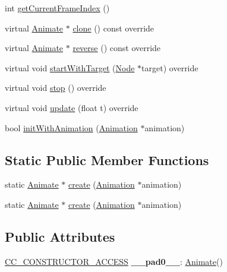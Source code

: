 \begin{DoxyCompactItemize}
\item 
int \hyperlink{classAnimate_a0817746a8202c5e57b45762ada7e7a32}{get\+Current\+Frame\+Index} ()
\item 
virtual \hyperlink{classAnimate}{Animate} $\ast$ \hyperlink{classAnimate_a71fedb833a7443dfd48237a6c3b339ab}{clone} () const override
\item 
virtual \hyperlink{classAnimate}{Animate} $\ast$ \hyperlink{classAnimate_a199fd586e88f3560c2b1cb1c3f18b04f}{reverse} () const override
\item 
virtual void \hyperlink{classAnimate_a44376cdc03073bcba141e3ec309622f7}{start\+With\+Target} (\hyperlink{classNode}{Node} $\ast$target) override
\item 
virtual void \hyperlink{classAnimate_acca8e3d000ced3182958b87e531ac423}{stop} () override
\item 
virtual void \hyperlink{classAnimate_a643f933a12b158eb94d1aaa2d8eff13f}{update} (float t) override
\item 
bool \hyperlink{classAnimate_a12360cf2067d0dfa3470ff2a3c248c34}{init\+With\+Animation} (\hyperlink{classAnimation}{Animation} $\ast$animation)
\end{DoxyCompactItemize}
\subsection*{Static Public Member Functions}
\begin{DoxyCompactItemize}
\item 
static \hyperlink{classAnimate}{Animate} $\ast$ \hyperlink{classAnimate_aaa1198ded0f8c25bd265ed8b0b9d8a1c}{create} (\hyperlink{classAnimation}{Animation} $\ast$animation)
\item 
static \hyperlink{classAnimate}{Animate} $\ast$ \hyperlink{classAnimate_a54e2e0807ac2a9d6542f478c60703de5}{create} (\hyperlink{classAnimation}{Animation} $\ast$animation)
\end{DoxyCompactItemize}
\subsection*{Public Attributes}
\begin{DoxyCompactItemize}
\item 
\mbox{\label{classAnimate_a204f7e377f75fbc1c9cc8db2d0a2da91}} 
\hyperlink{_2cocos2d_2cocos_2base_2ccConfig_8h_a25ef1314f97c35a2ed3d029b0ead6da0}{C\+C\+\_\+\+C\+O\+N\+S\+T\+R\+U\+C\+T\+O\+R\+\_\+\+A\+C\+C\+E\+SS} {\bfseries \+\_\+\+\_\+pad0\+\_\+\+\_\+}\+: \hyperlink{classAnimate}{Animate}()
\end{DoxyCompactItemize}
